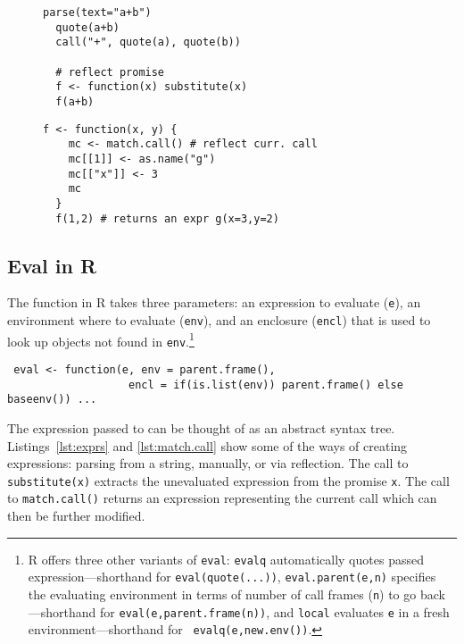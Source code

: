 \documentclass[acmsmall, screen]{acmart}
\renewcommand{\k}[1]{\lstinline |#1|\xspace}
\begin{document}
\begin{figure}[!t]
\begin{minipage}{.49\textwidth}
\begin{lstlisting}[caption={Examples of calls producing expression \k{a+b}},label=lst:exprs]
  parse(text="a+b")
  quote(a+b)
  call("+", quote(a), quote(b))

  # reflect promise
  f <- function(x) substitute(x)
  f(a+b)
  \end{lstlisting}
\end{minipage}
\begin{minipage}{.49\textwidth}
  \begin{lstlisting}[caption={Example of a call reflection},label=lst:match.call]
  f <- function(x, y) {
    mc <- match.call() # reflect curr. call
    mc[[1]] <- as.name("g")
    mc[["x"]] <- 3
    mc
  }
  f(1,2) # returns an expr g(x=3,y=2)
  \end{lstlisting}
\end{minipage}
\end{figure}

\subsection{Eval in R}\label{sec:eval-in-r}

The \eval function in R takes three parameters: an expression to evaluate
(\k{e}), an environment where to evaluate (\k{env}), and an enclosure (\k{encl})
that is used to look up objects not found in \k{env}.\footnote{R offers three
other variants of {\tt eval}: {\tt evalq} automatically quotes passed
expression---shorthand for {\tt eval(quote(...))}, {\tt eval.parent(e,n)}
specifies the evaluating environment in terms of number of call frames ({\tt n})
to go back---shorthand for {\tt eval(e,parent.frame(n))}, and {\tt local}
evaluates {\tt e} in a fresh environment---shorthand for {\tt
  evalq(e,new.env())}.}

\begin{lstlisting}
 eval <- function(e, env = parent.frame(),
                   encl = if(is.list(env)) parent.frame() else baseenv()) ...
\end{lstlisting}

The expression passed to \eval can be thought of as an abstract syntax tree.
Listings~\ref{lst:exprs} and \ref{lst:match.call} show some of the ways of
creating expressions: parsing from a string, manually, or via reflection. The
call to \k{substitute(x)} extracts the unevaluated expression from the promise
\k{x}. The call to \k{match.call()} returns an expression representing the
current call which can then be further modified.
\end{document}

